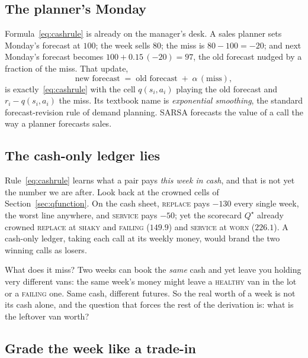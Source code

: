 \documentclass[11pt,a4paper]{article}
\theoremstyle{definition}
\theoremstyle{remark}
\numberwithin{equation}{section}
\newcommand{\sa}[1]{\textsc{#1}}   %
\begin{document}
\subsection*{The planner's Monday}

Formula~\eqref{eq:cashrule} is already on the manager's desk. A sales planner sets Monday's
forecast at $100$; the week sells $80$; the miss is $80 - 100 = -20$; and next Monday's
forecast becomes $100 + 0.15\,(-20) = 97$, the old forecast nudged by a fraction of the miss.
That update,
\[
\text{new forecast} \;=\; \text{old forecast} \;+\; \alpha\,(\text{miss}),
\]
is exactly~\eqref{eq:cashrule} with the cell $q(s_i, a_i)$ playing the old forecast and
$r_i - q(s_i, a_i)$ the miss. Its textbook name is \emph{exponential smoothing}, the standard
forecast-revision rule of demand planning. SARSA forecasts the value of a call the way a
planner forecasts sales.

\subsection*{The cash-only ledger lies}

Rule~\eqref{eq:cashrule} learns what a pair pays \emph{this week in cash}, and that is not yet
the number we are after. Look back at the crowned cells of Section~\ref{sec:qfunction}. On the
cash sheet, \sa{replace} pays $-130$ every single week, the worst line anywhere, and
\sa{service} pays $-50$; yet the scorecard $Q^\star$ already crowned \sa{replace} at \sa{shaky}
and \sa{failing} ($149.9$) and \sa{service} at \sa{worn} ($226.1$). A cash-only ledger, taking
each call at its weekly money, would brand the two winning calls as losers.

What does it miss? Two weeks can book the \emph{same} cash and yet leave you holding very
different vans: the same week's money might leave a \sa{healthy} van in the lot or a
\sa{failing} one. Same cash, different futures. So the real worth of a week is not its cash
alone, and the question that forces the rest of the derivation is: what is the leftover van
worth?

\subsection*{Grade the week like a trade-in}
\end{document}
